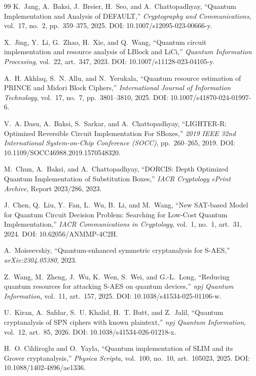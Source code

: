 \documentclass[10pt,a4paper]{article}
\begin{document}
\begin{thebibliography}{99}
K.~Jang, A.~Baksi, J.~Breier, H.~Seo, and A.~Chattopadhyay,
``Quantum Implementation and Analysis of DEFAULT,''
\emph{Cryptography and Communications}, vol.~17, no.~2, pp.~359--375, 2025.
DOI: 10.1007/s12095-023-00666-y.

X.~Jing, Y.~Li, G.~Zhao, H.~Xie, and Q.~Wang,
``Quantum circuit implementation and resource analysis of LBlock and LiCi,''
\emph{Quantum Information Processing}, vol.~22, art.~347, 2023.
DOI: 10.1007/s11128-023-04105-y.

A.~H. Akhlaq, S.~N. Allu, and N.~Yerukala,
``Quantum resource estimation of PRINCE and Midori Block Ciphers,''
\emph{International Journal of Information Technology}, vol.~17, no.~7, pp.~3801--3810, 2025.
DOI: 10.1007/s41870-024-01997-6.

V.~A. Dasu, A.~Baksi, S.~Sarkar, and A.~Chattopadhyay,
``LIGHTER-R: Optimized Reversible Circuit Implementation For SBoxes,''
\emph{2019 IEEE 32nd International System-on-Chip Conference (SOCC)}, pp.~260--265, 2019.
DOI: 10.1109/SOCC46988.2019.1570548320.

M.~Chun, A.~Baksi, and A.~Chattopadhyay,
``DORCIS: Depth Optimized Quantum Implementation of Substitution Boxes,''
\emph{IACR Cryptology ePrint Archive}, Report 2023/286, 2023.

J.~Chen, Q.~Liu, Y.~Fan, L.~Wu, B.~Li, and M.~Wang,
``New SAT-based Model for Quantum Circuit Decision Problem: Searching for Low-Cost Quantum Implementation,''
\emph{IACR Communications in Cryptology}, vol.~1, no.~1, art.~31, 2024.
DOI: 10.62056/ANMMP-4C2H.

A.~Moiseevskiy,
``Quantum-enhanced symmetric cryptanalysis for S-AES,''
\emph{arXiv:2304.05380}, 2023.

Z.~Wang, M.~Zheng, J.~Wu, K.~Wen, S.~Wei, and G.-L.~Long,
``Reducing quantum resources for attacking S-AES on quantum devices,''
\emph{npj Quantum Information}, vol.~11, art.~157, 2025.
DOI: 10.1038/s41534-025-01106-w.

U.~Kiran, A.~Safdar, S.~U. Khalid, H.~T. Butt, and Z.~Jalil,
``Quantum cryptanalysis of SPN ciphers with known plaintext,''
\emph{npj Quantum Information}, vol.~12, art.~85, 2026.
DOI: 10.1038/s41534-026-01218-x.

H.~O. Cildiroglu and O.~Yayla,
``Quantum implementation of SLIM and its Grover cryptanalysis,''
\emph{Physica Scripta}, vol.~100, no.~10, art.~105023, 2025.
DOI: 10.1088/1402-4896/ae1336.


\end{thebibliography}
\end{document}
